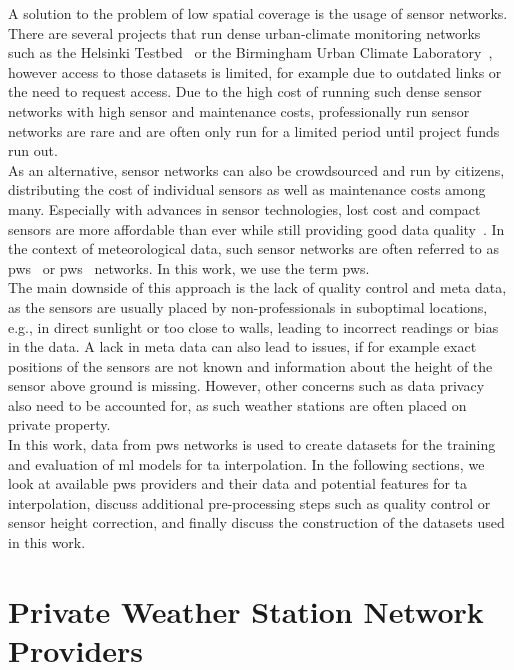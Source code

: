 A solution to the problem of low spatial coverage is the usage of sensor networks. There are several projects that run dense urban-climate monitoring networks~\cite{muller2013sensors} such as the Helsinki Testbed~\cite{koskinen2011helsinki} or the Birmingham Urban Climate Laboratory~\cite{warren2016birmingham}, however access to those datasets is limited, for example due to outdated links or the need to request access. Due to the high cost of running such dense sensor networks with high sensor and maintenance costs, professionally run sensor networks are rare and are often only run for a limited period until project funds run out.\\
As an alternative, sensor networks can also be crowdsourced and run by citizens, distributing the cost of individual sensors as well as maintenance costs among many. Especially with advances in sensor technologies, lost cost and compact sensors are more affordable than ever while still providing good data quality~\cite{grimmond2006progress, rundel2009environmental}. In the context of meteorological data, such sensor networks are often referred to as \gls{pws}~\cite{meier2017crowdsourcing} or \gls{pws}~\cite{hahn2022observations} networks. In this work, we use the term \gls{pws}.\\
The main downside of this approach is the lack of quality control and meta data, as the sensors are usually placed by non-professionals in suboptimal locations, e.g., in direct sunlight or too close to walls, leading to incorrect readings or bias in the data. A lack in meta data can also lead to issues, if for example exact positions of the sensors are not known and information about the height of the sensor above ground is missing. However, other concerns such as data privacy also need to be accounted for, as such weather stations are often placed on private property.\\
In this work, data from \gls{pws} networks is used to create datasets for the training and evaluation of \gls{ml} models for \gls{ta} interpolation. In the following sections, we look at available \gls{pws} providers and their data and potential features for \gls{ta} interpolation, discuss additional pre-processing steps such as quality control or sensor height correction, and finally discuss the construction of the datasets used in this work.

\section{Private Weather Station Network Providers}
\label{sec: private weather station network providers}


